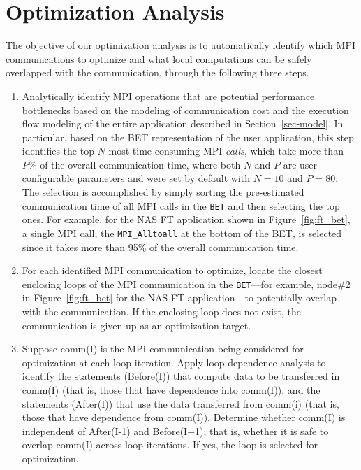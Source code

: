 \section{Optimization Analysis}
\label {sec-analysis}

The objective of our optimization analysis is to automatically identify which MPI communications to optimize
and  what local computations can be safely overlapped with the communication, through the following three steps.

\begin{enumerate}

\item Analytically identify MPI operations that are potential
  performance bottlenecks based on the modeling of communication cost
  and the execution flow modeling of the entire application described
  in Section~\ref{sec-model}.  In particular, based on the BET
  representation of the user application, this step identifies the top
  $N$ most time-consuming MPI \emph{calls}, which take more than $P\%$
  of the overall communication time, where both $N$ and $P$ are
  user-configurable parameters and were set by default with $N=10$ and
  $P=80$.  The selection is accomplished by simply sorting the
  pre-estimated communication time of all MPI calls in the
  \texttt{BET} and then selecting the top ones.  For example, for the
  NAS FT application shown in Figure~\ref{fig:ft_bet}, a single MPI
  call, the \texttt{MPI\_Alltoall} at the bottom of the BET, is
  selected since it takes more than 95\% of the overall communication
  time.

\item For each identified MPI communication to optimize, locate the closest
  enclosing loops of the MPI communication in the \texttt{BET}---for
  example, node\#2 in Figure~\ref{fig:ft_bet} for the NAS FT
  application---to potentially overlap with the communication.  If the
  enclosing loop does not exist, the communication is given up as an
  optimization target.

\item  Suppose comm(I) is the MPI communication being considered for optimization at each loop iteration. 
Apply loop dependence analysis to identify the statements (Before(I)) that compute data to be transferred in comm(I) (that is, those that have dependence into comm(I)), and the statements (After(I)) that  use the data transferred from comm(i) (that is, those that have dependence from comm(I)). Determine whether comm(I) is independent of After(I-1) and Before(I+1); that is, whether
it is safe to overlap comm(I) across loop iterations. If yes, the loop is selected for optimization. 
\end{enumerate}

